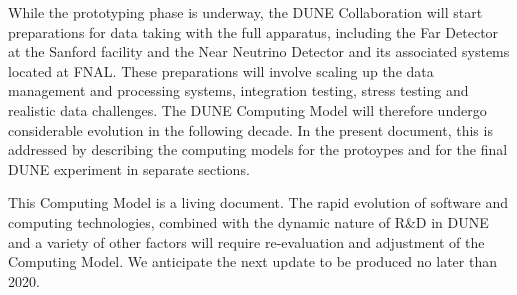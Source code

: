 While the prototyping phase is underway, the DUNE Collaboration will start preparations for data taking with the
full apparatus, including the Far Detector at the Sanford facility and the Near Neutrino Detector and its associated systems
located at FNAL.  These preparations will involve scaling up the data management and processing systems,
integration testing,  stress testing and realistic data challenges.
The DUNE Computing Model will therefore undergo considerable evolution in the following decade. In the present document,
this is addressed  by describing the computing models for the protoypes and for the final DUNE experiment in separate sections.

This Computing Model is a living document.
The rapid evolution of software and computing technologies, combined with the dynamic nature of R\&D in DUNE
and a variety of other factors will require re-evaluation and adjustment of the Computing Model. 
We anticipate the next update to be produced no later than 2020.
